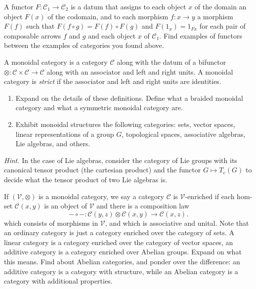 \begin{question} A functor $F: \mathcal{C}_1\longrightarrow 
\mathcal{C}_2$ is a datum that assigns to each object
$x$ of the domain an object $F(x)$ of the codomain,
and to each morphism $f:x\to y$ a morphism $F(f)$ such
that $F(f\circ g) = F(f) \circ F(g)$ and $F(1_x) = 1_{Fx}$
for each pair of composable arrows $f$ and $g$ and each
object $x$ of $\mathcal C_1$. Find examples of functors
between the examples of categories you found above.

\end{question}
\begin{question} A monoidal category is a category $\mathcal C$ 
along with the datum of a bifunctor $\otimes :
\mathcal{C}\times \mathcal{C}\longrightarrow \mathcal{C}$
along with an associator and left and right units. 
A monoidal category is \emph{strict} if the associator and left
and right units are identities.
\begin{enumerate}
\item Expand on the details of these definitions. Define what
a braided monoidal category and what a symmetric monoidal category are.
\item Exhibit monoidal
structures the following categories: sets, vector spaces,
linear representations of a group $G$, topological spaces,
associative algebras, Lie algebras, and others.
\end{enumerate}
 \emph{Hint.} In the case of Lie algebras,
 consider the category of Lie groups with its
 canonical tensor product (the cartesian product) 
 and the functor $G\longmapsto T_e(G)$ to decide
 what the tensor product of two Lie algebras is.
\end{question}


\begin{question}
If $(\mathcal{V},\otimes)$ is a monoidal category, we say a category $\mathcal{C}$ 
is $\mathcal V$-enriched if each hom-set 
$\mathcal{C}(x,y)$ is an object of $\mathcal{V}$ and
there is a composition law 
\[-\circ -: \mathcal C(y,z) \otimes  \mathcal C(x,y) 
	\longrightarrow \mathcal C(x,z). \] 
which consists of morphisms in $\mathcal{V}$, and which is 
associative and unital. Note that an ordinary category is
just a category enriched over the category of sets.
A linear category is a category enriched over the
category of vector spaces, an additive category is a
category enriched over Abelian groups.
Expand on what this means. Find about Abelian
categories, and ponder over the difference: an additive
category is a category with structure, while an
Abelian category is a category with additional properties.
\end{question}

